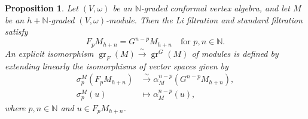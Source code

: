 \documentclass[a4paper, 12pt, reqno]{amsart}
\newtheorem{proposition}[theorem]{Proposition}
\theoremstyle{remark}
\numberwithin{equation}{subsection}
\DeclareMathOperator{\gr}{gr}
\begin{document}
\begin{proposition}
  \label{prp:15}
  Let $(V, \omega)$ be an $\mathbb{N}$-graded conformal vertex algebra, and let $M$ be an $h + \mathbb{N}$-graded $(V, \omega)$-module.
  Then the Li filtration and standard filtration satisfy
  \begin{equation*}
    F_pM_{h + n} = G^{n - p}M_{h + n} \quad \text{for }p, n \in \mathbb{N}.
  \end{equation*}
  An explicit isomorphism $\gr_F(M) \xrightarrow{\sim} \gr^G(M)$ of modules is defined by extending linearly the isomorphisms of vector spaces given by
  \begin{align*}
    \sigma^M_p(F_pM_{h + n}) &\xrightarrow{\sim} \alpha^{n - p}_M(G^{n - p}M_{h + n}), \\
    \sigma^M_p(u) &\mapsto \alpha^{n - p}_M(u),
  \end{align*}
  where $p, n \in \mathbb{N}$ and $u \in F_pM_{h + n}$.
\end{proposition}
\end{document}
